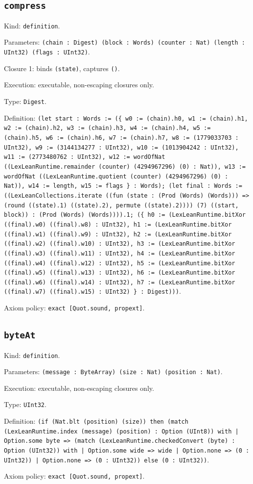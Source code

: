 \documentclass[11pt]{article}
\begin{document}
\subsection*{\texttt{compress}}
\noindent Kind: \texttt{definition}.\par
\noindent Parameters: \texttt{(chain : Digest) (block : Words) (counter : Nat) (length : UInt32) (flags : UInt32)}.\par
\noindent Closure 1: binds \texttt{(state)}, captures \texttt{()}.\par
\noindent Execution: executable, non-escaping closures only.\par
\noindent Type: \texttt{Digest}.\par
\noindent Definition: \texttt{(let start : Words := (\{ w0 := (chain).h0, w1 := (chain).h1, w2 := (chain).h2, w3 := (chain).h3, w4 := (chain).h4, w5 := (chain).h5, w6 := (chain).h6, w7 := (chain).h7, w8 := (1779033703 : UInt32), w9 := (3144134277 : UInt32), w10 := (1013904242 : UInt32), w11 := (2773480762 : UInt32), w12 := wordOfNat ((LexLeanRuntime.remainder (counter) (4294967296) (0) : Nat)), w13 := wordOfNat ((LexLeanRuntime.quotient (counter) (4294967296) (0) : Nat)), w14 := length, w15 := flags \} : Words); (let final : Words := ((LexLeanCollections.iterate ((fun (state : (Prod (Words) (Words))) => (round ((state).1) ((state).2), permute ((state).2)))) (7) ((start, block)) : (Prod (Words) (Words)))).1; (\{ h0 := (LexLeanRuntime.bitXor ((final).w0) ((final).w8) : UInt32), h1 := (LexLeanRuntime.bitXor ((final).w1) ((final).w9) : UInt32), h2 := (LexLeanRuntime.bitXor ((final).w2) ((final).w10) : UInt32), h3 := (LexLeanRuntime.bitXor ((final).w3) ((final).w11) : UInt32), h4 := (LexLeanRuntime.bitXor ((final).w4) ((final).w12) : UInt32), h5 := (LexLeanRuntime.bitXor ((final).w5) ((final).w13) : UInt32), h6 := (LexLeanRuntime.bitXor ((final).w6) ((final).w14) : UInt32), h7 := (LexLeanRuntime.bitXor ((final).w7) ((final).w15) : UInt32) \} : Digest)))}.\par
\noindent Axiom policy: \texttt{exact [Quot.sound, propext]}.\par
\subsection*{\texttt{byteAt}}
\noindent Kind: \texttt{definition}.\par
\noindent Parameters: \texttt{(message : ByteArray) (size : Nat) (position : Nat)}.\par
\noindent Execution: executable, non-escaping closures only.\par
\noindent Type: \texttt{UInt32}.\par
\noindent Definition: \texttt{(if (Nat.blt (position) (size)) then (match (LexLeanRuntime.index (message) (position) : Option (UInt8)) with | Option.some byte => (match (LexLeanRuntime.checkedConvert (byte) : Option (UInt32)) with | Option.some wide => wide | Option.none => (0 : UInt32)) | Option.none => (0 : UInt32)) else (0 : UInt32))}.\par
\noindent Axiom policy: \texttt{exact [Quot.sound, propext]}.\par
\end{document}
